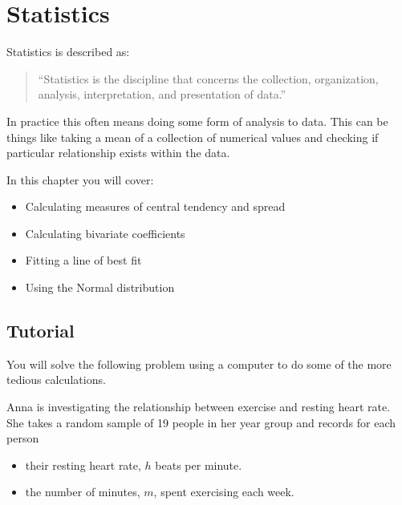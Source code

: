 \chapter{Statistics}
\label{chp:statistics}

Statistics is described as:
\begin{quote}
``Statistics is the discipline that concerns the collection, organization,
analysis, interpretation, and presentation of data.''
\end{quote}


In practice this often means doing some form of analysis to data.
This can be things like taking a mean of a collection of numerical
values and checking if particular relationship exists within the data.


\begin{note}
In this chapter you will cover:
\begin{itemize}
\item 

Calculating measures of central tendency and spread

\item 

Calculating bivariate coefficients

\item 

Fitting a line of best fit

\item 

Using the Normal distribution

\end{itemize}
\end{note}





\section{Tutorial}
\label{\detokenize{tools-for-mathematics/08-statistics/tutorial/main:tutorial}}\label{\detokenize{tools-for-mathematics/08-statistics/tutorial/main::doc}}

You will solve the following problem using a computer to do some of the more
tedious calculations.

Anna is investigating the relationship between exercise and resting heart rate.
She takes a random sample of 19 people in her year group and records for each person
\begin{itemize}
\item 

their resting heart rate, \(h\) beats per minute.

\item 

the number of minutes, \(m\), spent exercising each week.

\end{itemize}


